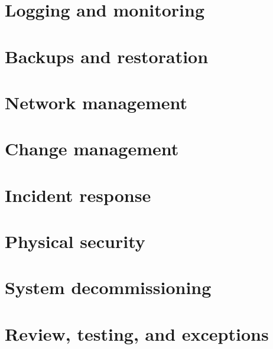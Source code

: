 \section{Logging and monitoring}


\section{Backups and restoration}


\section{Network management}


\section{Change management}


\section{Incident response}


\section{Physical security}


\section{System decommissioning}


\section{Review, testing, and exceptions}

